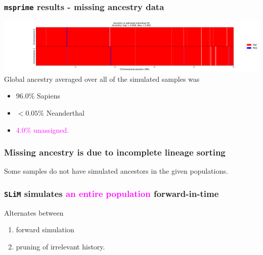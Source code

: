 \documentclass[11pt, mathserif, aspectratio=169]{beamer}
\newcommand{\magenta}[1]{\textcolor{magenta}{#1}}
\newenvironment{wideitemize}{\itemize\addtolength{\itemsep}{10pt}}{\enditemize}
\begin{document}
\begin{frame}
\frametitle{\texttt{msprime} results - missing ancestry data}
\includegraphics[scale=.22]{pics/msprime/msprime-sample.png}\quad\quad
Global ancestry averaged over all of the simulated samples was 
\begin{itemize}
\item $96.0\%$ Sapiens
\item $<0.05\%$ Neanderthal
\item \magenta{$4.0\%$ unassigned.}
\end{itemize}
\end{frame}

\begin{frame}
\frametitle{Missing ancestry is due to incomplete lineage sorting}
\begin{center}

\end{center}
Some samples do not have simulated ancestors in the given populations.
\end{frame}


\begin{frame}
\frametitle{\texttt{SLiM} simulates \magenta{an entire population} forward-in-time}
\begin{minipage}{.58\textwidth}

\end{minipage}\hfill
\begin{minipage}{.4\textwidth}
Alternates between
\begin{enumerate}
\item forward simulation
\item pruning of irrelevant history.
\end{enumerate}
\end{minipage}
\end{frame}
\end{document}
